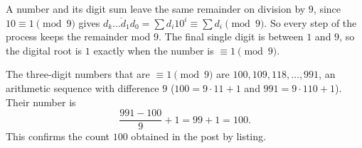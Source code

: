A number and its digit sum leave the same remainder on division by $9$, since $10\equiv1\pmod 9$ gives $\overline{d_k\dots d_1d_0}=\sum d_i10^i\equiv\sum d_i\pmod 9$. So every step of the process keeps the remainder mod $9$. The final single digit is between $1$ and $9$, so the digital root is $1$ exactly when the number is $\equiv1\pmod 9$.

The three-digit numbers that are $\equiv1\pmod9$ are $100,109,118,\dots,991$, an arithmetic sequence with difference $9$ ($100=9\cdot11+1$ and $991=9\cdot110+1$). Their number is
\[
\dfrac{991-100}{9}+1=99+1=\boxed{100}.
\]
This confirms the count $100$ obtained in the post by listing.
